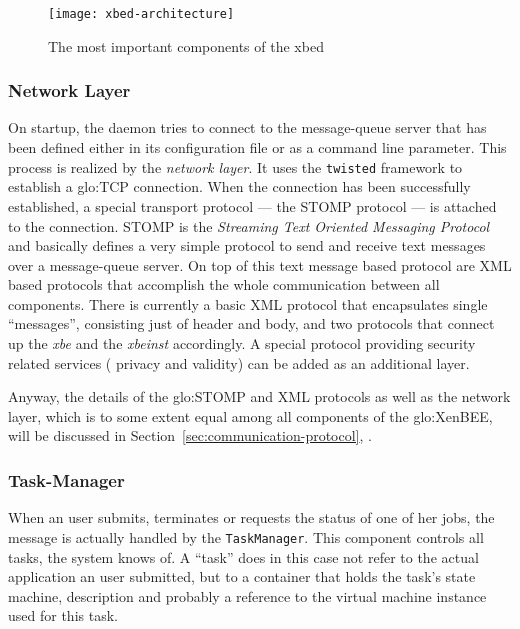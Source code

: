 \begin{figure}[ht]
  \centering
  \texttt{[image: xbed-architecture]}
  \caption[Components of the xbed]{The most important components of the xbed}
  \label{fig:xbed-architecture}
\end{figure}

\subsubsection{Network Layer}

On startup, the  daemon tries to connect to  the message-queue server that
has been  defined either in  its configuration file  or as a  command line
parameter. This process  is realized by the \emph{network  layer}. It uses
the  \texttt{twisted} framework to  establish a  \gls{glo:TCP} connection.
When the connection has been successfully established, a special transport
protocol  --- the  STOMP  protocol  \cite{stomp} ---  is  attached to  the
connection. STOMP is the \emph{Streaming Text Oriented Messaging Protocol}
and  basically defines a  very simple  protocol to  send and  receive text
messages over a  message-queue server.  On top of  this text message based
protocol are  XML based protocols that accomplish  the whole communication
between  all components.   There is  currently a  basic XML  protocol that
encapsulates single ``messages'', consisting  just of header and body, and
two  protocols  that connect  up  the  \emph{xbe}  and the  \emph{xbeinst}
accordingly.  A special protocol  providing security related services (\ie
privacy and validity) can be added as an additional layer.

Anyway, the  details of the \gls{glo:STOMP}  and XML protocols  as well as
the network layer,  which is to some extent equal  among all components of
the        \gls{glo:XenBEE},       will       be        discussed       in
Section~\ref{sec:communication-protocol},
\emph{}.

\subsubsection{Task-Manager}

When an  user submits,  terminates or  requests the status  of one  of her
jobs, the  message is actually handled by  the \texttt{TaskManager}.  This
component controls all tasks, the system knows of. A ``task'' does in this
case  not refer  to the  actual application  an user  submitted, but  to a
container that holds the task's  state machine, description and probably a
reference to the virtual machine instance used for this task.

